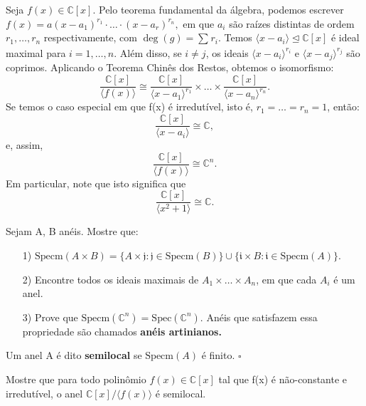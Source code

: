 \documentclass[AlgebraII/algebraII_notes.tex]{subfiles}
\begin{document}
\begin{example}
	Seja \(f(x)\in \mathbb{C}[x].\) Pelo teorema fundamental da álgebra, podemos escrever \(f(x) = a(x-a_{1})^{r_{1}}\cdot \dotsc \cdot (x-a_{r})^{r_{n}},\)
	em que \(a_{i}\) são raízes distintas de ordem \(r_{1}, \dotsc, r_{n}\) respectivamente, com \(\deg{(g)} = \sum\limits_{}^{}r_{i}.\) Temos
	\(\langle x-a_{i} \rangle \trianglelefteq{\mathbb{C}[x]}\) é ideal maximal para \(i=1, \dotsc, n.\) Além disso, se \(i\neq j\), os ideais
	\(\langle x-a_{i} \rangle^{r_{i}}\) e \(\langle x-a_{j} \rangle^{r_{j}}\) são coprimos. Aplicando o Teorema Chinês dos Restos, obtemos o isomorfismo:
	\[
		\frac{\mathbb{C}[x]}{\langle f(x) \rangle}\cong \frac{\mathbb{C}[x]}{\langle x-a_{1} \rangle^{r_{1}}}\times \dotsc\times \frac{\mathbb{C}[x]}{\langle x-a_{n} \rangle^{r_{n}}}.
	\]
	Se temos o caso especial em que f(x) é irredutível, isto é, \(r_{1} = \dotsc = r_{n} = 1\), então:
	\[
		\frac{\mathbb{C}[x]}{\langle x-a_{i} \rangle}\cong{\mathbb{C}},
	\]
	e, assim,
	\[
		\frac{\mathbb{C}[x]}{\langle f(x) \rangle}\cong{\mathbb{C}^{n}}.
	\]
	Em particular, note que isto significa que
	\[
		\frac{\mathbb{C}[x]}{\langle x^{2}+1 \rangle}\cong \mathbb{C}.
	\]
\end{example}
\begin{example}[Exercícios]
	Sejam A, B anéis. Mostre que:
	\begin{itemize}
		\item[1)] \(\mathrm{Specm}(A\times B) = \{A\times \mathfrak{j}:\mathfrak{j}\in \mathrm{Specm}(B)\}\cup\{\mathfrak{i}\times B:\mathfrak{i}\in \mathrm{Specm}(A)\}.\)
		\item[2)] Encontre todos os ideais maximais de \(A_{1}\times \dotsc\times A_{n}\), em que cada
		      \(A_{i}\) é um anel.
		\item[3)] Prove que \(\mathrm{Specm}(\mathbb{C}^{n}) = \mathrm{Spec}(\mathbb{C}^{n}).\) Anéis que satisfazem essa propriedade
		      são chamados \textbf{anéis artinianos.}
	\end{itemize}
\end{example}
\begin{def*}
	Um anel A é dito \textbf{semilocal} se \(\mathrm{Specm}(A)\) é finito. \(\square\)
\end{def*}
\begin{prop*}[Exercício]
	Mostre que para todo polinômio \(f(x)\in \mathbb{C}[x]\) tal que f(x) é não-constante e irredutível, o anel
	\(\mathbb{C}[x]/\langle f(x) \rangle\) é semilocal.
\end{prop*}
\end{document}
